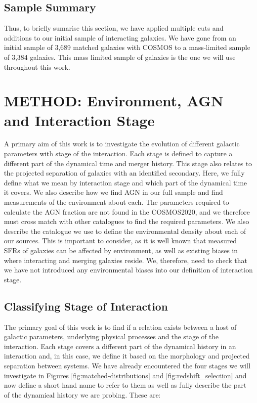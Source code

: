 \subsection{Sample Summary}\label{sec:sample-summary}
\noindent Thus, to briefly sumarise this section, we have applied multiple cuts and additions to our initial sample of interacting galaxies. We have gone from an initial sample of 3,689 matched galaxies with COSMOS to a mass-limited sample of 3,384 galaxies. This mass limited sample of galaxies is the one we will use throughout this work.

\section{METHOD: Environment, AGN and Interaction Stage} \label{method}
A primary aim of this work is to investigate the evolution of different galactic parameters with stage of the interaction. Each stage is defined to capture a different part of the dynamical time and merger history. This stage also relates to the projected separation of galaxies with an identified secondary. Here, we fully define what we mean by interaction stage and which part of the dynamical time it covers. We also describe how we find AGN in our full sample and find measurements of the environment about each. The parameters required to calculate the AGN fraction are not found in the COSMOS2020, and we therefore must cross match with other catalogues to find the required parameters. We also describe the catalogue we use to define the environmental density about each of our sources. This is important to consider, as it is well known that measured SFRs of galaxies can be affected by environment, as well as existing biases in where interacting and merging galaxies reside. We, therefore, need to check that we have not introduced any environmental biases into our definition of interaction stage. 

\subsection{Classifying Stage of Interaction}\label{sec:staging}
The primary goal of this work is to find if a relation exists between a host of galactic parameters, underlying physical processes and the stage of the interaction. Each stage covers a different part of the dynamical history in an interaction and, in this case, we define it based on the morphology and projected separation between systems. We have already encountered the four stages we will investigate in Figures \ref{fig:matched-distributions} and \ref{fig:redshift_selection} and now define a short hand name to refer to them as well as fully describe the part of the dynamical history we are probing. These are:

